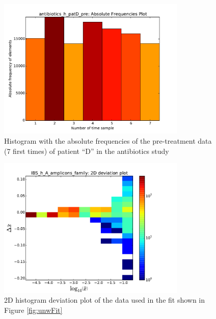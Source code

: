 \documentclass[12pt,oneside,letterpaper]{article}
\begin{document}
\begin{figure}
	\centering
	\includegraphics[width=0.8\textwidth]{results/hist/antibiotics_h_patD_pre_AbsFreqPlot}
	\caption{Histogram with the absolute frequencies of the pre-treatment data (7 first times) of patient ``D'' in the antibiotics study\cite{antibiotic}}
	\label{fig:histAFP}
\end{figure}

\begin{figure}
	\centering
	\includegraphics[width=0.8\textwidth]{results/hist/IBS_h_A_amplicons_family_hist2D.pdf}
	\caption{2D histogram deviation plot of the data used in the fit shown in Figure \ref{fig:unwFit}}
	\label{fig:hist2D}
\end{figure}
\end{document}
